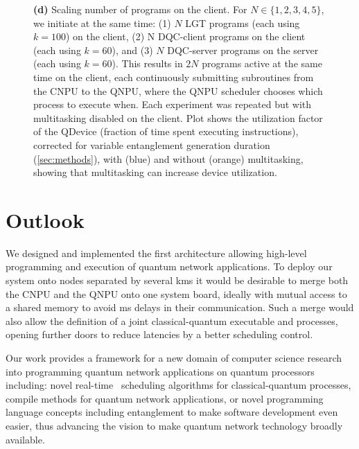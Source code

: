 \begin{figure}[htbp]
{\textbf{(d)} Scaling number of programs on the client. For $N \in \{1,2,3,4,5\}$, we initiate at the same time: (1) $N$ LGT programs (each using $k=100$) on the client, (2) N DQC-client programs on the client (each using $k=60$), and (3) $N$ DQC-server programs on the server (each using $k=60$). This results in $2N$ programs active at the same time on the client, each continuously submitting subroutines from the CNPU to the QNPU, where the QNPU scheduler chooses which process to execute when. Each experiment was repeated but with multitasking disabled on the client. Plot shows the utilization factor of the QDevice (fraction of time spent executing instructions), corrected for variable entanglement generation duration (\cref{sec:methods}), with (blue) and without (orange) multitasking, showing that multitasking can increase device utilization.}
\label{fig:fig4}
\end{figure}

\section{Outlook}
We designed and implemented the first architecture allowing high-level programming and execution of quantum network applications. To deploy our system onto nodes separated by several kms it would be desirable to merge both the CNPU and the QNPU onto one system board, ideally with mutual access to a shared memory to avoid ms delays in their communication. Such a merge would also allow the definition of a joint classical-quantum executable and processes, opening further doors to reduce latencies by a better scheduling control.

Our work provides a framework for a new domain of computer science research into programming quantum network applications on quantum processors including: novel real-time~\cite{ramamritham_scheduling_1994} scheduling algorithms for classical-quantum processes, compile methods for quantum network applications, or novel programming language concepts including entanglement to make software development even easier, thus advancing the vision to make quantum network technology broadly available.


